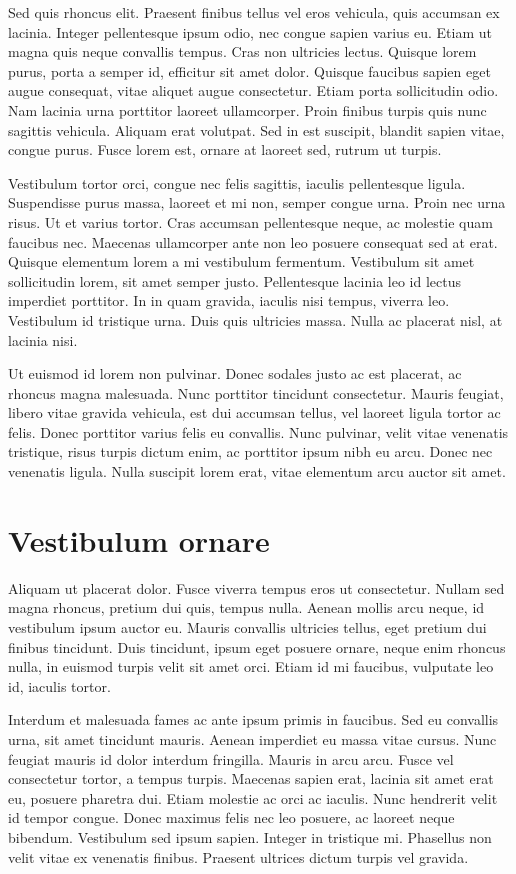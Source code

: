 Sed quis rhoncus elit. Praesent finibus tellus vel eros vehicula, quis accumsan ex lacinia. Integer pellentesque ipsum odio, nec congue sapien varius eu. Etiam ut magna quis neque convallis tempus. Cras non ultricies lectus. Quisque lorem purus, porta a semper id, efficitur sit amet dolor. Quisque faucibus sapien eget augue consequat, vitae aliquet augue consectetur. Etiam porta sollicitudin odio. Nam lacinia urna porttitor laoreet ullamcorper. Proin finibus turpis quis nunc sagittis vehicula. Aliquam erat volutpat. Sed in est suscipit, blandit sapien vitae, congue purus. Fusce lorem est, ornare at laoreet sed, rutrum ut turpis.

Vestibulum tortor orci, congue nec felis sagittis, iaculis pellentesque ligula. Suspendisse purus massa, laoreet et mi non, semper congue urna. Proin nec urna risus. Ut et varius tortor. Cras accumsan pellentesque neque, ac molestie quam faucibus nec. Maecenas ullamcorper ante non leo posuere consequat sed at erat. Quisque elementum lorem a mi vestibulum fermentum. Vestibulum sit amet sollicitudin lorem, sit amet semper justo. Pellentesque lacinia leo id lectus imperdiet porttitor. In in quam gravida, iaculis nisi tempus, viverra leo. Vestibulum id tristique urna. Duis quis ultricies massa. Nulla ac placerat nisl, at lacinia nisi.

Ut euismod id lorem non pulvinar. Donec sodales justo ac est placerat, ac rhoncus magna malesuada. Nunc porttitor tincidunt consectetur. Mauris feugiat, libero vitae gravida vehicula, est dui accumsan tellus, vel laoreet ligula tortor ac felis. Donec porttitor varius felis eu convallis. Nunc pulvinar, velit vitae venenatis tristique, risus turpis dictum enim, ac porttitor ipsum nibh eu arcu. Donec nec venenatis ligula. Nulla suscipit lorem erat, vitae elementum arcu auctor sit amet.

\section{Vestibulum ornare}

Aliquam ut placerat dolor. Fusce viverra tempus eros ut consectetur. Nullam sed magna rhoncus, pretium dui quis, tempus nulla. Aenean mollis arcu neque, id vestibulum ipsum auctor eu. Mauris convallis ultricies tellus, eget pretium dui finibus tincidunt. Duis tincidunt, ipsum eget posuere ornare, neque enim rhoncus nulla, in euismod turpis velit sit amet orci. Etiam id mi faucibus, vulputate leo id, iaculis tortor.

Interdum et malesuada fames ac ante ipsum primis in faucibus. Sed eu convallis urna, sit amet tincidunt mauris. Aenean imperdiet eu massa vitae cursus. Nunc feugiat mauris id dolor interdum fringilla. Mauris in arcu arcu. Fusce vel consectetur tortor, a tempus turpis. Maecenas sapien erat, lacinia sit amet erat eu, posuere pharetra dui. Etiam molestie ac orci ac iaculis. Nunc hendrerit velit id tempor congue. Donec maximus felis nec leo posuere, ac laoreet neque bibendum. Vestibulum sed ipsum sapien. Integer in tristique mi. Phasellus non velit vitae ex venenatis finibus. Praesent ultrices dictum turpis vel gravida.

